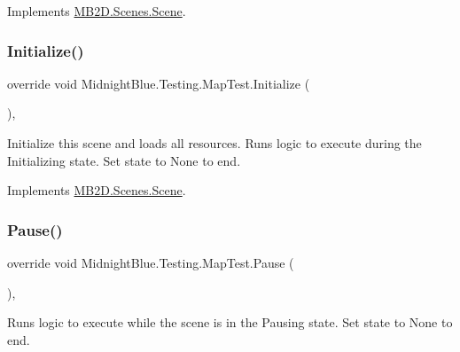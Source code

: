 Implements \hyperlink{class_m_b2_d_1_1_scenes_1_1_scene_a476de5a885408d27ff151044d20738c8}{M\+B2\+D.\+Scenes.\+Scene}.

\hypertarget{class_midnight_blue_1_1_testing_1_1_map_test_adcaa2f37efbf5764b48d297cabf17784}{}\label{class_midnight_blue_1_1_testing_1_1_map_test_adcaa2f37efbf5764b48d297cabf17784} 
\subsubsection{\texorpdfstring{Initialize()}{Initialize()}}
{\footnotesize\ttfamily override void Midnight\+Blue.\+Testing.\+Map\+Test.\+Initialize (\begin{DoxyParamCaption}{ }\end{DoxyParamCaption})\hspace{0.3cm}{\ttfamily [inline]}, {\ttfamily [virtual]}}



Initialize this scene and loads all resources. Runs logic to execute during the Initializing state. Set state to None to end. 



Implements \hyperlink{class_m_b2_d_1_1_scenes_1_1_scene_a081b4f8866936b495bdce388a7c96c25}{M\+B2\+D.\+Scenes.\+Scene}.

\hypertarget{class_midnight_blue_1_1_testing_1_1_map_test_a7dba960137d634b15e4f4b7b3a86489f}{}\label{class_midnight_blue_1_1_testing_1_1_map_test_a7dba960137d634b15e4f4b7b3a86489f} 
\subsubsection{\texorpdfstring{Pause()}{Pause()}}
{\footnotesize\ttfamily override void Midnight\+Blue.\+Testing.\+Map\+Test.\+Pause (\begin{DoxyParamCaption}{ }\end{DoxyParamCaption})\hspace{0.3cm}{\ttfamily [inline]}, {\ttfamily [virtual]}}



Runs logic to execute while the scene is in the Pausing state. Set state to None to end. 



